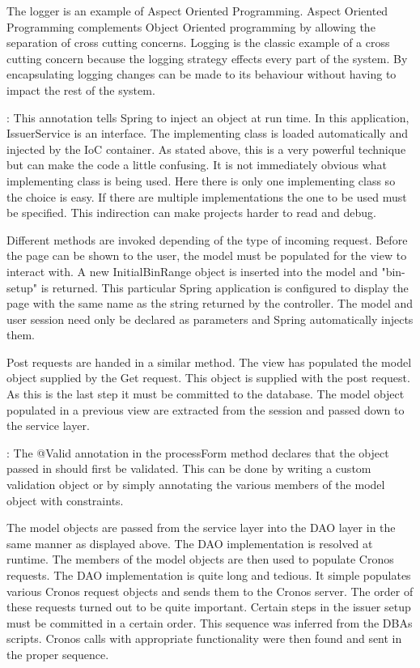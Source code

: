 \documentclass[a4paper, 11pt, titlepage]{article}
\begin{document}
\label{aspects} 
The logger is an example of Aspect Oriented Programming. Aspect Oriented Programming complements Object Oriented programming by allowing the separation of cross cutting concerns. Logging is the classic example of a cross cutting concern because the logging strategy effects every part of the system. By encapsulating logging changes can be made to its behaviour without having to impact the rest of the system. 
\cite{AOP} 
 
: This annotation tells Spring to inject an object at run time. In this application, IssuerService is an interface. The implementing class is loaded automatically and injected by the IoC container. As stated above, this is a very powerful technique but can make the code a little confusing. It is not immediately obvious what implementing class is being used. Here there is only one implementing class so the choice is easy. If there are multiple implementations the one to be used must be specified. This indirection can make projects harder to read and debug. 
 
Different methods are invoked depending of the type of incoming request. Before the page can be shown to the user, the model must be populated for the view to interact with. A new InitialBinRange object is inserted into the model and "bin-setup" is returned. This particular Spring application is configured to display the page with the same name as the string returned by the controller. The model and user session need only be declared as parameters and Spring automatically injects them. 
 
Post requests are handed in a similar method. The view has populated the model object supplied by the Get request. This object is supplied with the post request. As this is the last step it must be committed to the database. The model object populated in a previous view are extracted from the session and passed down to the service layer.  
 
: The @Valid annotation in the processForm method declares that the object passed in should first be validated. This can be done by writing a custom validation object or by simply annotating the various members of the model object with constraints.  
 
The model objects are passed from the service layer into the DAO layer in the same manner as displayed above. The DAO implementation is resolved at runtime. The members of the model objects are then used to populate Cronos requests. The DAO implementation is quite long and tedious. It simple populates various Cronos request objects and sends them to the Cronos server. The order of these requests turned out to be quite important. Certain steps in the issuer setup must be committed in a certain order. This sequence was inferred from the DBAs scripts. Cronos calls with appropriate functionality were then found and sent in the proper sequence.  
 
\end{document}
